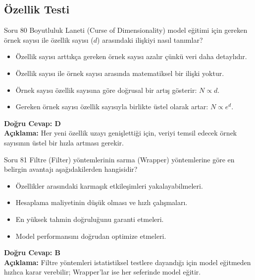 \documentclass[12pt,a4paper]{article}
\begin{document}
\newpage
\subsection{Özellik Testi}

\begin{testcard}{Soru 80}
    Boyutluluk Laneti (Curse of Dimensionality) model eğitimi için gereken örnek sayısı ile özellik sayısı ($d$) arasındaki ilişkiyi nasıl tanımlar?
    \begin{itemize}
        \item[A)] Özellik sayısı arttıkça gereken örnek sayısı azalır çünkü veri daha detaylıdır.
        \item[B)] Özellik sayısı ile örnek sayısı arasında matematiksel bir ilişki yoktur.
        \item[C)] Örnek sayısı özellik sayısına göre doğrusal bir artış gösterir: $N \propto d$.
        \item[D)] Gereken örnek sayısı özellik sayısıyla birlikte üstel olarak artar: $N \propto e^d$.
    \end{itemize}
    \tcblower
    \textbf{Doğru Cevap: D} \\
    \textbf{Açıklama:} Her yeni özellik uzayı genişlettiği için, veriyi temsil edecek örnek sayısının üstel bir hızla artması gerekir.
\end{testcard}

\begin{testcard}{Soru 81}
    Filtre (Filter) yöntemlerinin sarma (Wrapper) yöntemlerine göre en belirgin avantajı aşağıdakilerden hangisidir?
    \begin{itemize}
        \item[A)] Özellikler arasındaki karmaşık etkileşimleri yakalayabilmeleri.
        \item[B)] Hesaplama maliyetinin düşük olması ve hızlı çalışmaları.
        \item[C)] En yüksek tahmin doğruluğunu garanti etmeleri.
        \item[D)] Model performansını doğrudan optimize etmeleri.
    \end{itemize}
    \tcblower
    \textbf{Doğru Cevap: B} \\
    \textbf{Açıklama:} Filtre yöntemleri istatistiksel testlere dayandığı için model eğitmeden hızlıca karar verebilir; Wrapper'lar ise her seferinde model eğitir.
\end{testcard}
\end{document}
